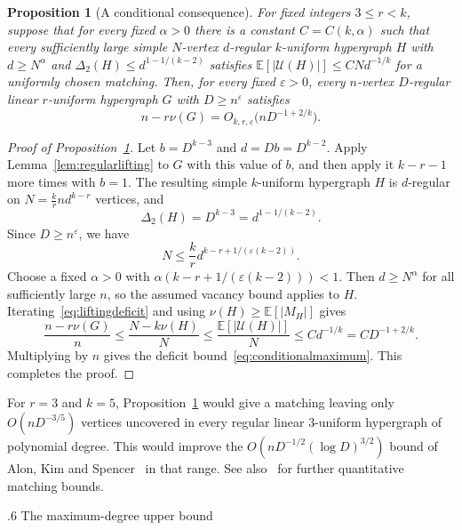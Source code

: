 \documentclass[11pt,reqno]{amsart}
\makeatletter
\numberwithin{equation}{section}
\renewcommand{\section}{\@startsection{section}{1}%
    \z@{1.3\linespacing\@plus.5\linespacing\@minus.2\linespacing}%
    {.6\linespacing}%
    {\normalfont\scshape\centering}}
\theoremstyle{plain}
\newtheorem{proposition}[theorem]{Proposition}
\theoremstyle{definition}
\newcommand{\E}{\mathbb E}
\newcommand{\eps}{\varepsilon}
\newcommand{\calU}{\mathcal U}
\makeatother
\begin{document}
\begin{proposition}[A conditional consequence]\label{prop:conditionallifting}
    For fixed integers $3\le r<k$, suppose that for every fixed $\alpha>0$ there is a constant $C=C(k,\alpha)$ such that every sufficiently large simple $N$-vertex $d$-regular $k$-uniform hypergraph $H$ with $d\ge N^\alpha$ and $\Delta_2(H)\le d^{1-1/(k-2)}$ satisfies $\E[|\calU(H)|]\le CNd^{-1/k}$ for a uniformly chosen matching.
    Then, for every fixed $\eps>0$, every $n$-vertex $D$-regular linear $r$-uniform hypergraph $G$ with $D\ge n^\eps$ satisfies
    \begin{equation}\label{eq:conditionalmaximum}
        n-r\nu(G)=O_{k,r,\eps}\bigl(nD^{-1+2/k}\bigr).
    \end{equation}
\end{proposition}
\begin{proof}[Proof of Proposition~\ref{prop:conditionallifting}]
    Let $b=D^{k-3}$ and $d=Db=D^{k-2}$.
    Apply Lemma~\ref{lem:regularlifting} to $G$ with this value of $b$, and then apply it $k-r-1$ more times with $b=1$.
    The resulting simple $k$-uniform hypergraph $H$ is $d$-regular on $N=\frac kr nd^{k-r}$ vertices, and
    \begin{equation}\label{eq:lifted-codegree}
        \Delta_2(H)=D^{k-3}=d^{1-1/(k-2)}.
    \end{equation}
    Since $D\ge n^\eps$, we have
    \[
        N\le\frac kr d^{k-r+1/(\eps(k-2))}.
    \]
    Choose a fixed $\alpha>0$ with
    $\alpha(k-r+1/(\eps(k-2)))<1$.
    Then $d\ge N^\alpha$ for all sufficiently large $n$, so the assumed vacancy bound applies to $H$.
    Iterating~\eqref{eq:liftingdeficit} and using $\nu(H)\ge\E[|M_H|]$ gives
    \[
        \frac{n-r\nu(G)}n
        \le\frac{N-k\nu(H)}N
        \le\frac{\E[|\calU(H)|]}N
        \le Cd^{-1/k}=CD^{-1+2/k}.
    \]
    Multiplying by $n$ gives the deficit bound~\eqref{eq:conditionalmaximum}.
    This completes the proof.
\end{proof}

For $r=3$ and $k=5$, Proposition~\ref{prop:conditionallifting} would give a matching leaving only $O(nD^{-3/5})$ vertices uncovered in every regular linear $3$-uniform hypergraph of polynomial degree.
This would improve the $O(nD^{-1/2}(\log D)^{3/2})$ bound of Alon, Kim and Spencer~\cite{AKS} in that range.
See also~\cite{KKMO,GK} for further quantitative matching bounds.


\section{The maximum-degree upper bound}\label{sec:maxdegreeproof}
\end{document}

